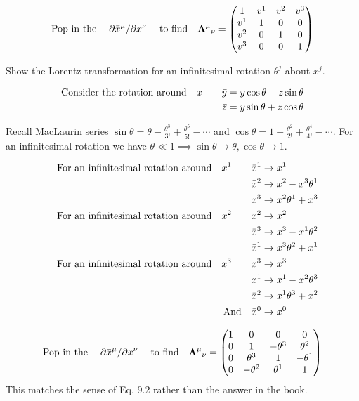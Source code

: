 \documentclass{article}
\begin{document}
\[ \qq*{Pop in the}\pdv*{\bar{x}^\mu}{x^\nu}\qq{to find}{\vb{\Lambda}^\mu}_\nu=\begin{pmatrix}1&v^1&v^2&v^3\\v^1&1&0&0\\v^2&0&1&0\\v^3&0&0&1\\
\end{pmatrix}\]

Show the Lorentz transformation for an infinitesimal rotation $\theta^j$ about $x^j$. 

\begin{align*}
	\qq*{Consider the rotation around}x\qquad
	\bar{y}&=y\cos\theta-z\sin\theta\\
	\bar{z}&=y\sin\theta+z\cos\theta
\end{align*}

Recall MacLaurin series $\sin\theta=\theta-\frac{\theta^3}{3!}+\frac{\theta^5}{5!}-\cdots$ and $\cos\theta=1-\frac{\theta^2}{2!}+\frac{\theta^4}{4!}-\cdots$.
For an infinitesimal rotation we have $\theta\ll1\implies \sin\theta\to\theta, \cos\theta\to 1$.

\begin{align*}
	\qq{For an infinitesimal rotation around}x^1\qquad \bar{x}^1 &\to x^1\\
	\bar{x}^2 &\to x^2 -x^3 \theta^1\\
	\bar{x}^3 &\to x^2 \theta^1 +x^3\\
	\qq{For an infinitesimal rotation around}x^2\qquad \bar{x}^2 &\to x^2\\
	\bar{x}^3 &\to x^3 -x^1 \theta^2\\
	\bar{x}^1 &\to x^3 \theta^2 +x^1\\
	\qq{For an infinitesimal rotation around}x^3\qquad \bar{x}^3 &\to x^3\\
	\bar{x}^1 &\to x^1 -x^2 \theta^3\\
	\bar{x}^2 &\to x^1 \theta^3 +x^2\\
	\qq{And} \bar{x}^0 &\to x^0\\
\end{align*}

\[ \qq*{Pop in the}\pdv*{\bar{x}^\mu}{x^\nu}\qq{to find}{\vb{\Lambda}^\mu}_\nu=\begin{pmatrix}1&0&0&0\\0&1&-\theta^3&\theta^2\\0&\theta^3&1&-\theta^1\\0&-\theta^2&\theta^1&1\\
\end{pmatrix}\]
This matches the sense of Eq. 9.2 rather than the answer in the book.
\end{document}
